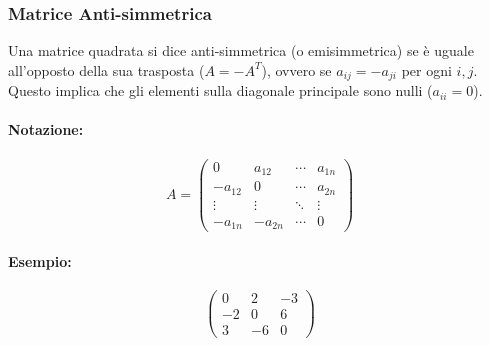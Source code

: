 \documentclass{article}
\begin{document}
\subsubsection*{Matrice Anti-simmetrica}
Una matrice quadrata si dice anti-simmetrica (o emisimmetrica) se è uguale all'opposto della sua trasposta ($A = -A^T$), ovvero se $a_{ij} = -a_{ji}$ per ogni $i,j$. Questo implica che gli elementi sulla diagonale principale sono nulli ($a_{ii} = 0$).
\paragraph{Notazione:}
\[ A = \begin{pmatrix}
0 & a_{12} & \cdots & a_{1n} \\
-a_{12} & 0 & \cdots & a_{2n} \\
\vdots & \vdots & \ddots & \vdots \\
-a_{1n} & -a_{2n} & \cdots & 0
\end{pmatrix} \]
\paragraph{Esempio:}
\[ \begin{pmatrix}
0 & 2 & -3 \\
-2 & 0 & 6 \\
3 & -6 & 0
\end{pmatrix} \]
\end{document}
